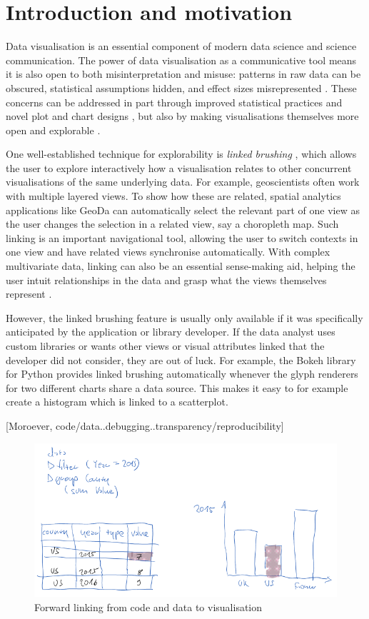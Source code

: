 \section{Introduction and motivation}

Data visualisation is an essential component of modern data science and science
communication. The power of data visualisation as a communicative tool means it
is also open to both misinterpretation and misuse: patterns in raw data can be
obscured, statistical assumptions hidden, and effect sizes misrepresented
\cite{weissgerber15}. These concerns can be addressed in part through improved
statistical practices and novel plot and chart designs \cite{allen19}, but also
by making visualisations themselves more open and explorable
\cite{dragicevic19}.

One well-established technique for explorability is \emph{linked brushing}
\cite{fisherkeller75,becker87,buja91}, which allows the user to explore
interactively how a visualisation relates to other concurrent visualisations of
the same underlying data. For example, geoscientists often work with multiple
layered views. To show how these are related, spatial analytics applications
like GeoDa \cite{anselin06} can automatically select the relevant part of one
view as the user changes the selection in a related view, say a choropleth map.
Such linking is an important navigational tool, allowing the user to switch
contexts in one view and have related views synchronise automatically. With
complex multivariate data, linking can also be an essential sense-making aid,
helping the user intuit relationships in the data and grasp what the views
themselves represent \cite{he18}.

However, the linked brushing feature is usually only available if it was
specifically anticipated by the application or library developer. If the data
analyst uses custom libraries or wants other views or visual attributes linked
that the developer did not consider, they are out of luck. For example, the
Bokeh library for Python \cite{jolly18} provides linked brushing automatically
whenever the glyph renderers for two different charts share a data source. This
makes it easy to for example create a histogram which is linked to a
scatterplot.

[Moroever, code/data..debugging..transparency/reproducibility]

\begin{figure}[H]
\includegraphics[scale=0.35]{image/chart-fwd}
\caption{Forward linking from code and data to visualisation}
\end{figure}

